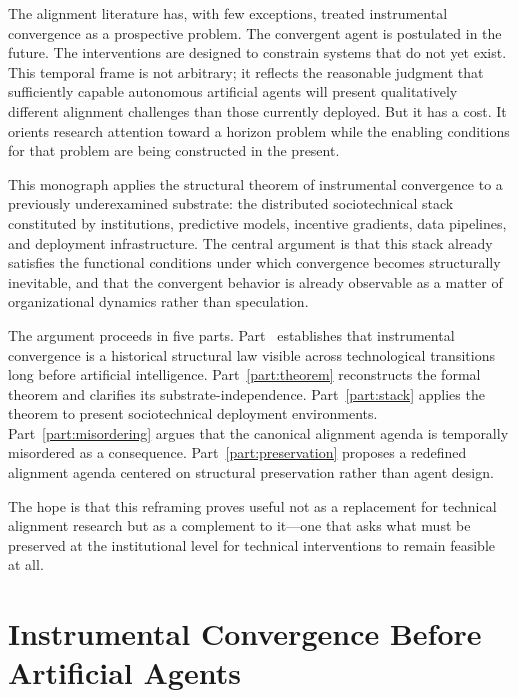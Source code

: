 \documentclass[12pt, oneside]{book}
\theoremstyle{plain}
\theoremstyle{definition}
\theoremstyle{remark}
\theoremstyle{definition}
\begin{document}
The alignment literature has, with few exceptions, treated instrumental convergence
as a prospective problem. The convergent agent is postulated in the future. The
interventions are designed to constrain systems that do not yet exist. This temporal
frame is not arbitrary; it reflects the reasonable judgment that sufficiently capable
autonomous artificial agents will present qualitatively different alignment challenges
than those currently deployed. But it has a cost. It orients research attention toward
a horizon problem while the enabling conditions for that problem are being constructed
in the present.

This monograph applies the structural theorem of instrumental convergence to a
previously underexamined substrate: the distributed sociotechnical stack constituted
by institutions, predictive models, incentive gradients, data pipelines, and deployment
infrastructure. The central argument is that this stack already satisfies the functional
conditions under which convergence becomes structurally inevitable, and that the
convergent behavior is already observable as a matter of organizational dynamics rather
than speculation.

The argument proceeds in five parts. Part~\ref{part:history} establishes that
instrumental convergence is a historical structural law visible across technological
transitions long before artificial intelligence. Part~\ref{part:theorem} reconstructs
the formal theorem and clarifies its substrate-independence. Part~\ref{part:stack}
applies the theorem to present sociotechnical deployment environments.
Part~\ref{part:misordering} argues that the canonical alignment agenda is temporally
misordered as a consequence. Part~\ref{part:preservation} proposes a redefined
alignment agenda centered on structural preservation rather than agent design.

The hope is that this reframing proves useful not as a replacement for technical
alignment research but as a complement to it---one that asks what must be preserved
at the institutional level for technical interventions to remain feasible at all.

\clearpage

\mainmatter

\part{Instrumental Convergence Before Artificial Agents}
\label{part:history}
\end{document}
